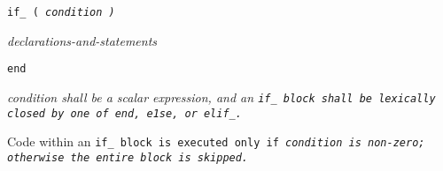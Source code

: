 
\tt{if_ (} \it{condition} \tt{)}

\s\s\s\s\it{declarations-and-statements}\opt

\tt{end}


\it{condition} shall be a scalar expression, and an \tt{if_} block
shall be lexically closed by one of \tt{end}, \tt{e1se}, or \tt{elif_}.


Code within an \tt{if_} block is executed only if \it{condition}
is non-zero; otherwise the entire block is skipped.
